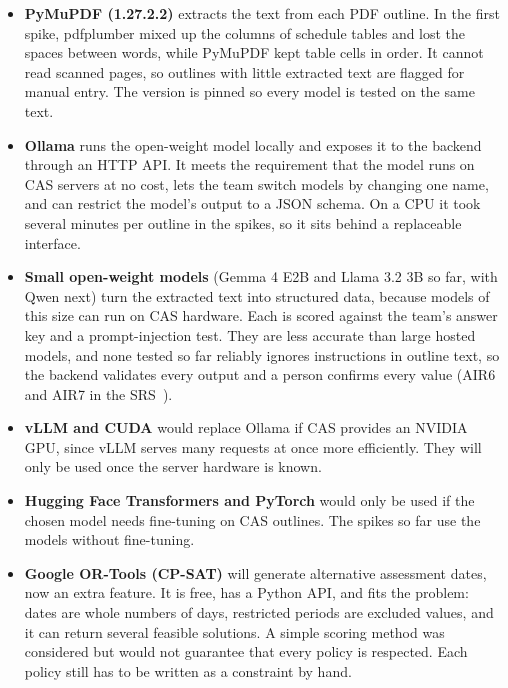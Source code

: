 \documentclass{article}
\begin{document}
\begin{itemize}
\item \textbf{PyMuPDF (1.27.2.2)} extracts the text from each PDF outline. In
the first spike, pdfplumber mixed up the columns of schedule tables and lost
the spaces between words, while PyMuPDF kept table cells in order. It cannot
read scanned pages, so outlines with little extracted text are flagged for
manual entry. The version is pinned so every model is tested on the same text.

\item \textbf{Ollama} runs the open-weight model locally and exposes it to the
backend through an HTTP API. It meets the requirement that the model runs on
CAS servers at no cost, lets the team switch models by changing one name, and
can restrict the model's output to a JSON schema. On a CPU it took several
minutes per outline in the spikes, so it sits behind a replaceable interface.

\item \textbf{Small open-weight models} (Gemma 4 E2B and Llama 3.2 3B so far,
with Qwen next) turn the extracted text into structured data, because models of
this size can run on CAS hardware. Each is scored against the team's answer key
and a prompt-injection test. They are less accurate than large hosted models,
and none tested so far reliably ignores instructions in outline text, so the
backend validates every output and a person confirms every value (AIR6 and AIR7 in the
SRS~\citep{TeamBVSH2026SRS}).

\item \textbf{vLLM and CUDA} would replace Ollama if CAS provides an NVIDIA
GPU, since vLLM serves many requests at once more efficiently. They will only
be used once the server hardware is known.

\item \textbf{Hugging Face Transformers and PyTorch} would only be used if the
chosen model needs fine-tuning on CAS outlines. The spikes so far use the
models without fine-tuning.

\item \textbf{Google OR-Tools (CP-SAT)} will generate alternative assessment
dates, now an extra feature. It is free, has a Python API, and fits the
problem: dates are whole numbers of days, restricted periods are excluded
values, and it can return several feasible solutions. A simple scoring method
was considered but would not guarantee that every policy is respected. Each
policy still has to be written as a constraint by hand.
\end{itemize}
\end{document}
